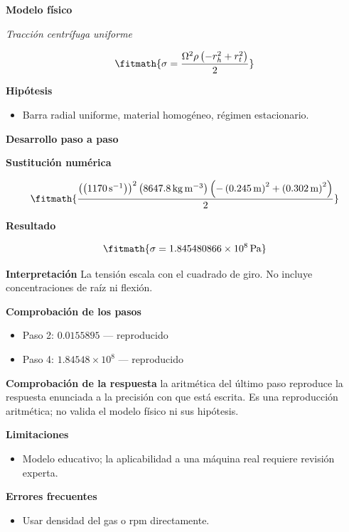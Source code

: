 \documentclass[10pt,openany]{book}
\begin{document}
\noindent\textbf{Modelo físico}

\noindent\textit{Tracción centrífuga uniforme}

\[
\fitmath{\sigma=\frac{\Omega^{2} \rho \left(- r_h^{2} + r_t^{2}\right)}{2}}
\]

\noindent\textbf{Hipótesis}
\begin{itemize}
\item Barra radial uniforme, material homogéneo, régimen estacionario.
\end{itemize}

\noindent\textbf{Desarrollo paso a paso}



\noindent\textbf{Sustitución numérica}

\[
\fitmath{\frac{\left(\left(1170\,\mathrm{s}^{-1}\right)\right)^{2} \left(8647.8\,\mathrm{kg}\,\mathrm{m}^{-3}\right) \left(- \left(0.245\,\mathrm{m}\right)^{2} + \left(0.302\,\mathrm{m}\right)^{2}\right)}{2}}
\]

\noindent\textbf{Resultado}

\[
\fitmath{\sigma=1.845480866\times10^{8}\,\mathrm{Pa}}
\]

\noindent\textbf{Interpretación}
La tensión escala con el cuadrado de giro. No incluye concentraciones de raíz ni flexión.

\noindent\textbf{Comprobación de los pasos}
\begin{itemize}
\item Paso 2: $0.0155895$ — reproducido
\item Paso 4: $1.84548\times 10^{8}$ — reproducido
\end{itemize}

\noindent\textbf{Comprobación de la respuesta} la aritmética del último paso reproduce la respuesta enunciada a la precisión con que está escrita. Es una reproducción aritmética; no valida el modelo físico ni sus hipótesis.

\noindent\textbf{Limitaciones}
\begin{itemize}
\item Modelo educativo; la aplicabilidad a una máquina real requiere revisión experta.
\end{itemize}

\noindent\textbf{Errores frecuentes}
\begin{itemize}
\item Usar densidad del gas o rpm directamente.
\end{itemize}
\end{document}
